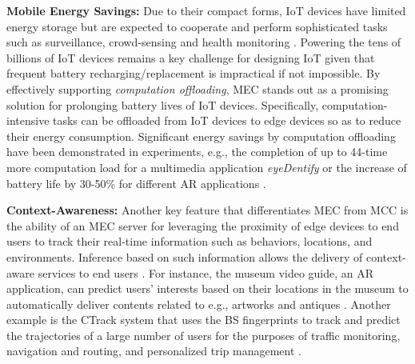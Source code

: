 \documentclass[journal]{IEEEtran}
\begin{document}
\textbf{Mobile Energy Savings:} Due to their compact forms, IoT devices have limited energy storage but are expected to cooperate and perform sophisticated tasks such as surveillance, crowd-sensing and health monitoring \cite{ASomovIEEEIoT1511}. Powering the tens of billions of IoT devices remains a key challenge for designing IoT given that frequent battery recharging/replacement is impractical if not impossible.  By effectively supporting \emph{computation offloading}, MEC stands out as a promising solution for prolonging battery lives of IoT devices. Specifically, computation-intensive tasks can be offloaded from IoT devices  to edge devices so as to reduce their energy consumption.  Significant energy savings by computation offloading have been demonstrated  in experiments, e.g., the completion of up to 44-time more computation load for  a multimedia application \emph{eyeDentify} \cite{KempEyeDentify09} or the increase of  battery life by  30-50\% for different AR applications \cite{BShiACMMulti1510}.

\textbf{Context-Awareness:} Another key feature that differentiates MEC from MCC is the ability of an MEC server for leveraging the proximity of edge devices to end users to track their  real-time information such as behaviors, locations, and environments. Inference based on such information allows the delivery of context-aware services to end users \cite{schilit1995system,perera2014context,nunna2015enabling}. For instance, the museum video guide, an AR application, can predict users' interests based on their locations in the museum to automatically deliver contents related to e.g., artworks and antiques \cite{luo2009augmented}. Another example is the CTrack system that uses the BS fingerprints to track and predict the trajectories of a large number of users for the purposes of traffic monitoring, navigation and routing, and personalized trip management \cite{thiagarajan2011accurate}.
\end{document}
